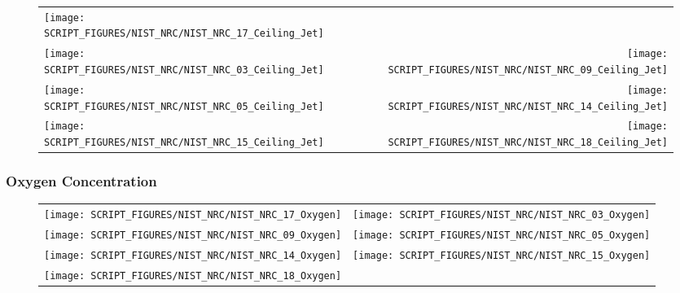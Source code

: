 \begin{figure}[!ht]
\begin{tabular*}{\textwidth}{l@{\extracolsep{\fill}}r}
\texttt{[image: SCRIPT\_FIGURES/NIST\_NRC/NIST\_NRC\_17\_Ceiling\_Jet]} &
 \\
\texttt{[image: SCRIPT\_FIGURES/NIST\_NRC/NIST\_NRC\_03\_Ceiling\_Jet]} &
\texttt{[image: SCRIPT\_FIGURES/NIST\_NRC/NIST\_NRC\_09\_Ceiling\_Jet]} \\
\texttt{[image: SCRIPT\_FIGURES/NIST\_NRC/NIST\_NRC\_05\_Ceiling\_Jet]} &
\texttt{[image: SCRIPT\_FIGURES/NIST\_NRC/NIST\_NRC\_14\_Ceiling\_Jet]} \\
\texttt{[image: SCRIPT\_FIGURES/NIST\_NRC/NIST\_NRC\_15\_Ceiling\_Jet]} &
\texttt{[image: SCRIPT\_FIGURES/NIST\_NRC/NIST\_NRC\_18\_Ceiling\_Jet]}
\end{tabular*}
\label{NIST_NRC_Jet_Open}
\end{figure}

\clearpage

\subsubsection{Oxygen Concentration}

\begin{figure}[!ht]
\begin{tabular*}{\textwidth}{l@{\extracolsep{\fill}}r}
\texttt{[image: SCRIPT\_FIGURES/NIST\_NRC/NIST\_NRC\_17\_Oxygen]} &
\texttt{[image: SCRIPT\_FIGURES/NIST\_NRC/NIST\_NRC\_03\_Oxygen]} \\
\texttt{[image: SCRIPT\_FIGURES/NIST\_NRC/NIST\_NRC\_09\_Oxygen]} &
\texttt{[image: SCRIPT\_FIGURES/NIST\_NRC/NIST\_NRC\_05\_Oxygen]} \\
\texttt{[image: SCRIPT\_FIGURES/NIST\_NRC/NIST\_NRC\_14\_Oxygen]} &
\texttt{[image: SCRIPT\_FIGURES/NIST\_NRC/NIST\_NRC\_15\_Oxygen]} \\
\texttt{[image: SCRIPT\_FIGURES/NIST\_NRC/NIST\_NRC\_18\_Oxygen]} &
\end{tabular*}
\label{NIST_NRC_Gas_Open_1}
\end{figure}

